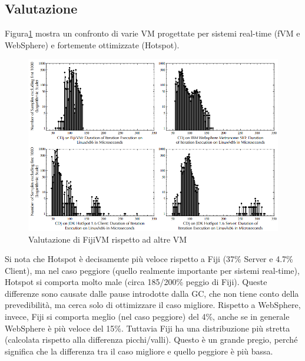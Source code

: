 \subsection{Valutazione}
Figura\ref{fig:fijicomp} mostra un confronto di varie VM progettate per sistemi real-time (fVM e WebSphere) e fortemente ottimizzate (Hotspot). 
\begin{figure}[h]
	\centering
	\includegraphics[width=0.8\linewidth]{images/fijicomp}
	\caption[Valutazione rispetto ad altre VM]{Valutazione di FijiVM rispetto ad altre VM}
	\label{fig:fijicomp}
\end{figure}

Si nota che Hotspot è decisamente più veloce rispetto a Fiji (37\% Server e 4.7\% Client), ma nel caso peggiore (quello realmente importante per sistemi real-time), Hotspot si comporta molto male (circa 185/200\% peggio di Fiji). Queste differenze sono causate dalle pause introdotte dalla GC, che non tiene conto della prevedibilità, ma cerca solo di ottimizzare il caso migliore. Rispetto a WebSphere, invece, Fiji si comporta meglio (nel caso peggiore) del 4\%, anche se in generale WebSphere è più veloce del 15\%. Tuttavia Fiji ha una distribuzione più stretta (calcolata rispetto alla differenza picchi/valli). Questo è un grande pregio, perché significa che la differenza tra il caso migliore e quello peggiore è più bassa.

